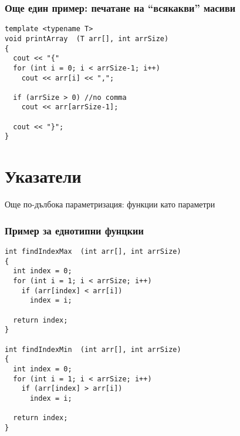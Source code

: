 \documentclass{beamer}
\begin{document}
\begin{frame}[fragile]
\frametitle{Още един пример: печатане на ``всякакви'' масиви}


\begin{flushleft}
\begin{lstlisting}
template <typename T>
void printArray  (T arr[], int arrSize)
{
  cout << "{"
  for (int i = 0; i < arrSize-1; i++)
    cout << arr[i] << ",";

  if (arrSize > 0) //no comma
    cout << arr[arrSize-1];

  cout << "}";
}
\end{lstlisting}  
\end{flushleft}

\end{frame}

\section{Указатели} 

\begin{frame}
\centerline{Още по-дълбока параметризация: функции като параметри}
\end{frame}

\begin{frame}[fragile]
\frametitle{Пример за еднотипни фунцкии}

\begin{flushleft}
\begin{lstlisting}
int findIndexMax  (int arr[], int arrSize)
{
  int index = 0;
  for (int i = 1; i < arrSize; i++)
    if (arr[index] < arr[i])
      index = i;

  return index;
}

int findIndexMin  (int arr[], int arrSize)
{
  int index = 0;
  for (int i = 1; i < arrSize; i++)
    if (arr[index] > arr[i])
      index = i;

  return index;
}

\end{lstlisting}  
\end{flushleft}

\end{frame}
\end{document}
